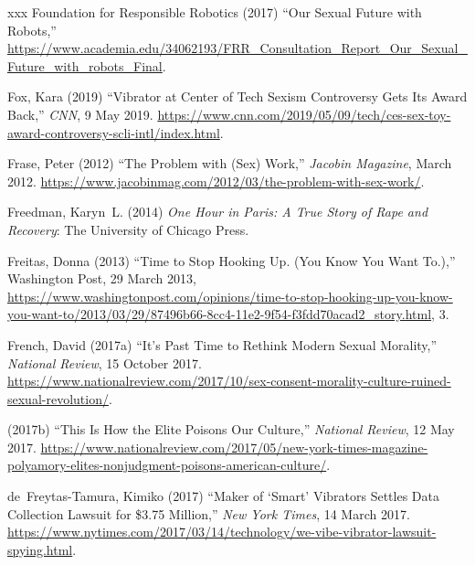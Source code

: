 \documentclass[]{jlreq} \usepackage{mystyle}
\begin{document}
\begin{thebibliography}{xxx}
{Foundation for Responsible Robotics} (2017) ``Our Sexual Future with Robots,''
  \url{https://www.academia.edu/34062193/FRR_Consultation_Report_Our_Sexual_Future_with_robots_Final}.

Fox, Kara (2019) ``Vibrator at Center of Tech Sexism Controversy Gets Its Award
  Back,'' \emph{CNN}, 9 May 2019.
  \url{https://www.cnn.com/2019/05/09/tech/ces-sex-toy-award-controversy-scli-intl/index.html}.

Frase, Peter (2012) ``The Problem with (Sex) Work,'' \emph{Jacobin Magazine},
  March 2012.
  \url{https://www.jacobinmag.com/2012/03/the-problem-with-sex-work/}.

Freedman, Karyn~L. (2014)  \textit{ One Hour in Paris: A True Story of Rape and
  Recovery}: The University of Chicago Press.

Freitas, Donna (2013) ``Time to Stop Hooking Up. (You Know You Want To.),''
  Washington Post, 29 March 2013,
  \url{https://www.washingtonpost.com/opinions/time-to-stop-hooking-up-you-know-you-want-to/2013/03/29/87496b66-8cc4-11e2-9f54-f3fdd70acad2_story.html},
  3.

French, David (2017a) ``It's Past Time to Rethink Modern Sexual Morality,''
  \emph{National Review}, 15 October 2017.
  \url{https://www.nationalreview.com/2017/10/sex-consent-morality-culture-ruined-sexual-revolution/}.

 \bysame{}  (2017b) ``This Is How the Elite Poisons Our Culture,''
  \emph{National Review}, 12 May 2017.
  \url{https://www.nationalreview.com/2017/05/new-york-times-magazine-polyamory-elites-nonjudgment-poisons-american-culture/}.

de~Freytas-Tamura, Kimiko (2017) ``Maker of `Smart' Vibrators Settles Data
  Collection Lawsuit for \$3.75 Million,'' \emph{New York Times}, 14 March
  2017.
  \url{https://www.nytimes.com/2017/03/14/technology/we-vibe-vibrator-lawsuit-spying.html}.


\end{thebibliography}
\end{document}
